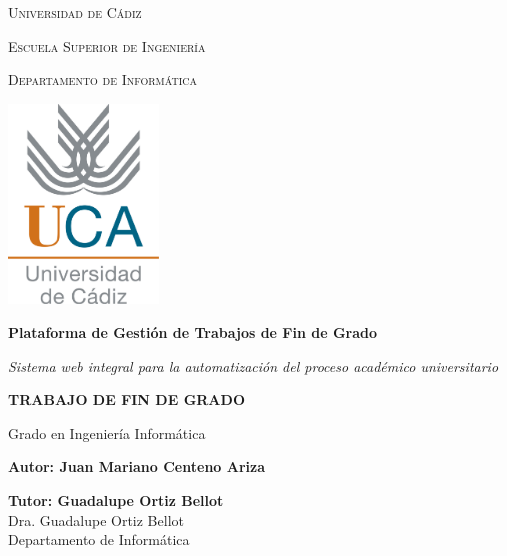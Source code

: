 
\begin{titlepage}
\centering

{\scshape\LARGE Universidad de Cádiz \par}
\vspace{1cm}
{\scshape\Large Escuela Superior de Ingeniería\par}
{\scshape\large Departamento de Informática\par}
\vspace{1.5cm}

\includegraphics[width=0.3\textwidth]{images/logo-universidad.jpg}\par\vspace{1cm}

{\huge\bfseries Plataforma de Gestión de Trabajos de Fin de Grado\par}
\vspace{0.5cm}
{\Large\itshape Sistema web integral para la automatización del proceso académico universitario\par}

\vspace{2cm}

{\Large\textbf{TRABAJO DE FIN DE GRADO}\par}
\vspace{0.5cm}
{\large Grado en Ingeniería Informática\par}

\vspace{2.5cm}

\begin{minipage}[t]{0.4\textwidth}
\begin{flushleft}
\large
\textbf{Autor: Juan Mariano Centeno Ariza}
\end{flushleft}
\end{minipage}
\hfill
\begin{minipage}[t]{0.4\textwidth}
\begin{flushright}
\large
\textbf{Tutor: Guadalupe Ortiz Bellot}\\
Dra. Guadalupe Ortiz Bellot\\
Departamento de Informática
\end{flushright}
\end{minipage}


\end{titlepage}
